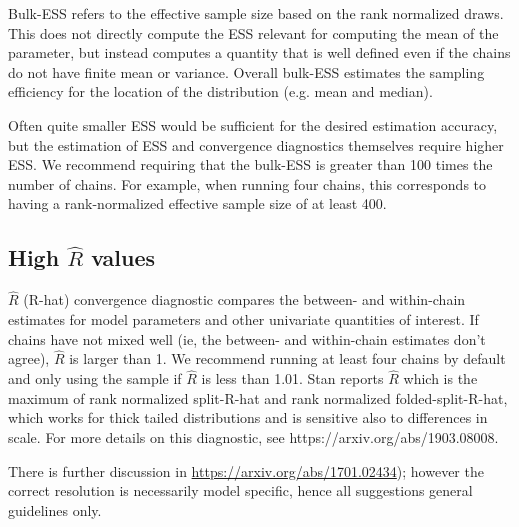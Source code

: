 Bulk-ESS refers to the effective sample size based on the rank
normalized draws. This does not directly compute the ESS relevant for
computing the mean of the parameter, but instead computes a quantity
that is well defined even if the chains do not have finite mean or
variance. Overall bulk-ESS estimates the sampling efficiency for the
location of the distribution (e.g. mean and median).

Often quite smaller ESS would be sufficient for the desired estimation
accuracy, but the estimation of ESS and convergence diagnostics
themselves require higher ESS.  We recommend requiring that the
bulk-ESS is greater than 100 times the number of chains. For example,
when running four chains, this corresponds to having a rank-normalized
effective sample size of at least 400.


\subsection{High $\hat{R}$ values}

$\hat{R}$ (R-hat) convergence diagnostic compares the between- and within-chain
estimates for model parameters and other univariate quantities of
interest. If chains have not mixed well (ie, the between- and
within-chain estimates don't agree), $\hat{R}$ is larger than 1. We
recommend running at least four chains by default and only using the
sample if $\hat{R}$ is less than 1.01. Stan reports $\hat{R}$ which is the
maximum of rank normalized split-R-hat and rank normalized
folded-split-R-hat, which works for thick tailed distributions and is
sensitive also to differences in scale. For more details on this
diagnostic, see https://arxiv.org/abs/1903.08008.

There is further discussion in  \url{https://arxiv.org/abs/1701.02434});
however the correct resolution is necessarily model specific,
hence all suggestions general guidelines only.

